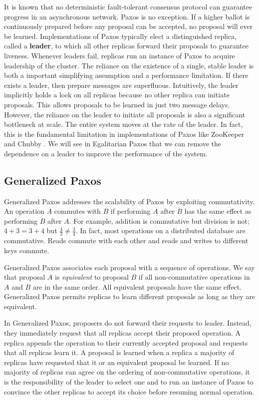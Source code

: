 \documentclass[../main.tex]{subfiles}
\begin{document}
  It is known that no deterministic fault-tolerant consensus protocol can guarantee progress in an
  asynchronous network. \cite{consensus} Paxos is no exception. If a higher ballot is continuously
  prepared before any proposal can be accepted, no proposal will ever be learned. Implementations of
  Paxos typically elect a distinguished replica, called a \textbf{leader}, to which all other
  replicas forward their proposals to guarantee liveness. Whenever leaders fail, replicas run an
  instance of Paxos to acquire leadership of the cluster. The reliance on the existence of a single,
  stable leader is both a important simplifying assumption and a performance limitation. If there
  exists a leader, then prepare messages are superfluous. Intuitively, the leader implicitly holds
  a lock on all replicas because no other replica can initiate proposals. This allows proposals to
  be learned in just two message delays. However, the reliance on the leader to initiate all
  proposals is also a significant bottleneck at scale. The entire system moves at the rate of the
  leader. In fact, this is the fundamental limitation in implementations of Paxos like ZooKeeper
  \cite{zookeeper} and Chubby \cite{chubby}. We will see in Egalitarian Paxos that we can remove the
  dependence on a leader to improve the performance of the system.

  \subsection{Generalized Paxos}
  Generalized Paxos addresses the scalability of Paxos by exploiting commutativity. An operation
  $A$ commutes with $B$ if performing $A$ after $B$ has the same effect as performing $B$ after $A$.
  For example, addition is commutative but division is not; $4 + 3 = 3 + 4$ but $\frac{4}{3} \ne
  \frac{3}{4}$. In fact, most operations on a distributed database are commutative. Reads commute
  with each other and reads and writes to different keys commute. \cite{generalized-paxos}

  Generalized Paxos associates each proposal with a sequence of operations. We say that proposal $A$
  is \emph{equivalent} to proposal $B$ if all non-commutative operations in $A$ and $B$ are in the
  same order. All equivalent proposals have the same effect. Generalized Paxos permits replicas to
  learn different proposals as long as they are equivalent.

  In Generalized Paxos, proposers do not forward their requests to leader. Instead, they immediately
  request that all replicas accept their proposed operation. A replica appends the operation to
  their currently accepted proposal and requests that all replicas learn it. A proposal is learned
  when a replica a majority of replicas have requested that it or an equivalent proposal be learned.
  If no majority of replicas can agree on the ordering of non-commutative operations, it is the
  responsibility of the leader to select one and to run an instance of Paxos to convince the other
  replicas to accept its choice before resuming normal operation.
\end{document}
